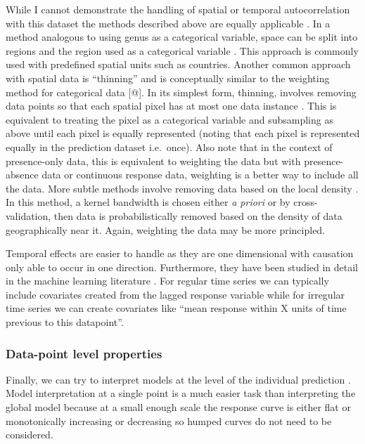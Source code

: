 \documentclass[10pt,]{article}
\begin{document}
While I cannot demonstrate the handling of spatial or temporal autocorrelation with this dataset the methods described above are equally applicable \citep{elith2009species}. In a method analogous to using genus as a categorical variable, space can be split into regions and the region used as a categorical variable \citep{appelhans2015evaluating}. This approach is commonly used with predefined spatial units such as countries. Another common approach with spatial data is ``thinning'' and is conceptually similar to the weighting method for categorical data {[}@{]}. In its simplest form, thinning, involves removing data points so that each spatial pixel has at most one data instance \citep{elith2010art, verbruggen2013improving}. This is equivalent to treating the pixel as a categorical variable and subsampling as above until each pixel is equally represented (noting that each pixel is represented equally in the prediction dataset i.e.~once). Also note that in the context of presence-only data, this is equivalent to weighting the data but with presence-absence data or continuous response data, weighting is a better way to include all the data. More subtle methods involve removing data based on the local density \citep{verbruggen2013improving}. In this method, a kernel bandwidth is chosen either \emph{a priori} or by cross-validation, then data is probabilistically removed based on the density of data geographically near it. Again, weighting the data may be more principled.

Temporal effects are easier to handle as they are one dimensional with causation only able to occur in one direction. Furthermore, they have been studied in detail in the machine learning literature \citep{jeong2008non}. For regular time series we can typically include covariates created from the lagged response variable while for irregular time series we can create covariates like ``mean response within X units of time previous to this datapoint''.

\subsubsection{Data-point level properties}\label{data-point-level-properties}

Finally, we can try to interpret models at the level of the individual prediction \citep{lime, ribeiro2016should, lundberg2017unified, ribeiro2016nothing}. Model interpretation at a single point is a much easier task than interpreting the global model because at a small enough scale the response curve is either flat or monotonically increasing or decreasing so humped curves do not need to be considered.
\end{document}
